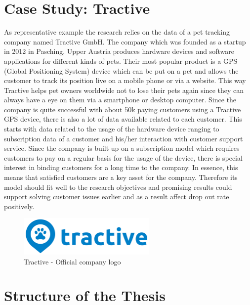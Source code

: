 \section{Case Study: Tractive}
\label{sec:illustrationExample}

As representative example the research relies on the data of a pet tracking company named Tractive GmbH. The company which was founded as a startup in 2012 in Pasching, Upper Austria produces hardware devices and software applications for different kinds of pets. Their most popular product is a GPS (Global Positioning System) device which can be put on a pet and allows the customer to track its position live on a mobile phone or via a website. This way Tractive helps pet owners worldwide not to lose their pets again since they can always have a eye on them via a smartphone or desktop computer. Since the company is quite successful with about 50k paying customers using a Tractive GPS device, there is also a lot of data available related to each customer. This starts with data related to the usage of the hardware device ranging to subscription data of a customer and his/her interaction with customer support service. Since the company is built up on a subscription model which requires customers to pay on a regular basis for the usage of the device, there is special interest in binding customers for a long time to the company. In essence, this means that satisfied customers are a key asset for the company. Therefore its model should fit well to the research objectives and promising results could support solving customer issues earlier and as a result affect drop out rate positively. 

\begin{figure}[H]
	\centering
	\includegraphics[width=0.6\textwidth]{img/tractive-logo.png}
	\caption{Tractive - Official company logo}	
\end{figure}

\section{Structure of the Thesis}

